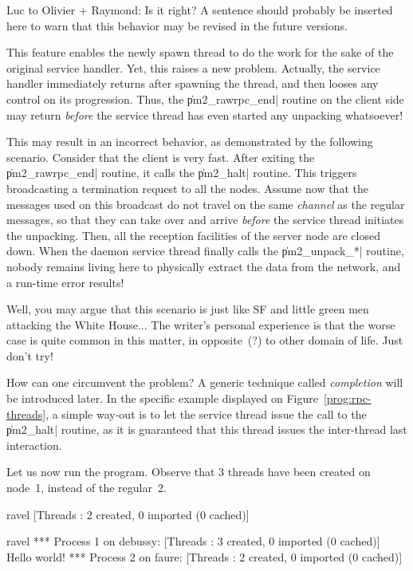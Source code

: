 \begin{note}
  Luc to Olivier + Raymond: Is it right? A sentence should probably be
  inserted here to warn that this behavior may be revised in the
  future versions.
\end{note}

This feature enables the newly spawn thread to do the work for the
sake of the original service handler. Yet, this raises a new
problem. Actually, the service handler immediately returns after
spawning the thread, and then looses any control on its
progression. Thus, the \|pm2_rawrpc_end| routine on the client side
may return \emph{before} the service thread has even started any
unpacking whatsoever! 

This may result in an incorrect behavior, as demonstrated by the
following scenario. Consider that the client is very fast. After
exiting the \|pm2_rawrpc_end| routine, it calls the \|pm2_halt|
routine. This triggers broadcasting a termination request to all the
nodes. Assume now that the messages used on this broadcast do not
travel on the same \emph{channel} as the regular messages, so that
they can take over and arrive \emph{before} the service thread
initiates the unpacking. Then, all the reception facilities of the
server node are closed down. When the daemon service thread finally
calls the \|pm2_unpack_*| routine, nobody remains living here to
physically extract the data from the network, and a run-time error
results!

Well, you may argue that this scenario is just like SF and little
green men attacking the White House... The writer's personal
experience is that the worse case is quite common in this matter, in
opposite~(?) to other domain of life. Just don't try!

How can one circumvent the problem? A generic technique called
\emph{completion} will be introduced later. In the specific example
displayed on Figure~\ref{prog:rpc-threads}, a simple way-out is to let
the service thread issue the call to the \|pm2_halt| routine, as it is
guaranteed that this thread issues the inter-thread last interaction.

Let us now run the program. Observe that 3 threads have been
created on node~1, instead of the regular~2.
\begin{shell}
ravel%
[Threads : 2 created, 0 imported (0 cached)]

ravel%
*** Process 1 on debussy:
[Threads : 3 created, 0 imported (0 cached)]
Hello world!
*** Process 2 on faure:
[Threads : 2 created, 0 imported (0 cached)]
\end{shell}

